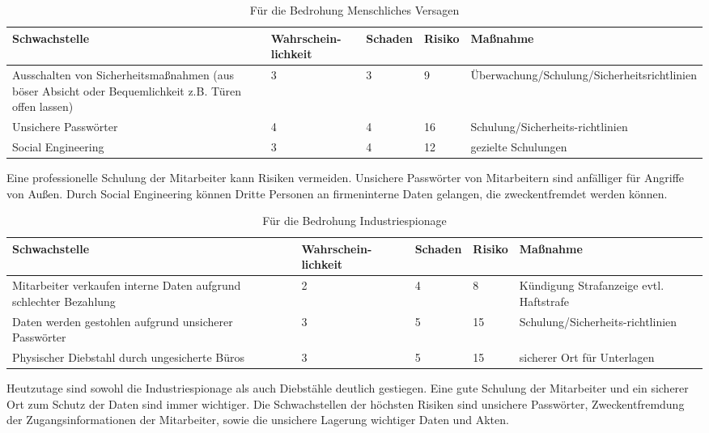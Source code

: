 \begin{table}[H]
\caption{Für die Bedrohung Menschliches Versagen}
\begin{tabu} to \linewidth {X[-1,l,m] X[-1,l,m] X[-1,l,m] X[-1,l,m] X[-1,l,m] }
\toprule 
\textbf{Schwachstelle} & \textbf{Wahrschein-\linebreak{}lichkeit} & \textbf{Schaden} & \textbf{Risiko} & \textbf{Maßnahme}\tabularnewline
\midrule 
Ausschalten von Sicherheitsmaßnahmen (aus böser Absicht oder Bequemlichkeit z.B. Türen offen lassen) & 3 & 3 & 9 & Überwachung/Schulung/Sicherheitsrichtlinien\tabularnewline
Unsichere Passwörter & 4 & 4 & 16 & Schulung/\linebreak{}Sicherheits-\linebreak{}richtlinien\tabularnewline
Social Engineering & 3 & 4 & 12 & gezielte Schulungen\tabularnewline
\bottomrule
\end{tabu}
\end{table}

Eine professionelle Schulung der Mitarbeiter kann Risiken vermeiden. Unsichere Passwörter von Mitarbeitern sind anfälliger für Angriffe von Außen. Durch Social Engineering können Dritte Personen an firmeninterne Daten gelangen, die zweckentfremdet werden können.

\begin{table}[H]
\caption{Für die Bedrohung Industriespionage}
\begin{tabu} to \linewidth {X[-1,l,m] X[-1,l,m] X[-1,l,m] X[-1,l,m] X[-1,l,m] }
\toprule 
\textbf{Schwachstelle} & \textbf{Wahrschein-\linebreak{}lichkeit} & \textbf{Schaden} & \textbf{Risiko} & \textbf{Maßnahme}\tabularnewline
\midrule 
Mitarbeiter verkaufen interne Daten aufgrund schlechter Bezahlung & 2 & 4 & 8 & Kündigung
Strafanzeige evtl. Haftstrafe
\tabularnewline
Daten werden gestohlen aufgrund unsicherer Passwörter & 3 & 5 & 15 & Schulung/\linebreak{}Sicherheits-\linebreak{}richtlinien\tabularnewline
Physischer Diebstahl durch ungesicherte Büros & 3 & 5 & 15 & sicherer Ort für Unterlagen\tabularnewline
\bottomrule
\end{tabu}
\end{table}

Heutzutage sind sowohl die Industriespionage als auch Diebstähle deutlich gestiegen. Eine gute Schulung der Mitarbeiter und ein sicherer Ort zum Schutz der Daten sind immer wichtiger. Die Schwachstellen der höchsten Risiken sind unsichere Passwörter, Zweckentfremdung der Zugangsinformationen der Mitarbeiter, sowie die unsichere Lagerung wichtiger Daten und Akten.


